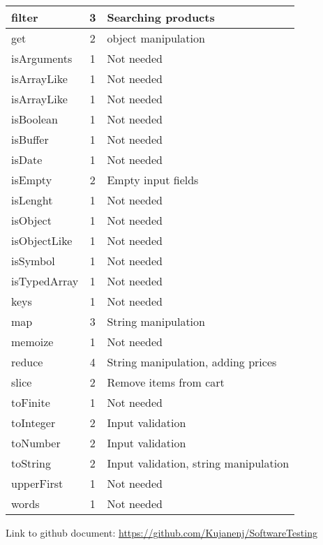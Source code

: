\documentclass[a4paper, 12pt]{article}
\begin{document}
\begin{table}[ht]
\begin{tabular}{l|c|l}
	    filter       & 3                 & Searching products                    \\ \hline
	    get          & 2                 & object manipulation                   \\ \hline
	    isArguments  & 1                 & Not needed                            \\ \hline
	    isArrayLike  & 1                 & Not needed                            \\ \hline
	    isArrayLike  & 1                 & Not needed                            \\ \hline
	    isBoolean    & 1                 & Not needed                            \\ \hline
	    isBuffer     & 1                 & Not needed                            \\ \hline
	    isDate       & 1                 & Not needed                            \\ \hline
	    isEmpty      & 2                 & Empty input fields                    \\ \hline
	    isLenght     & 1                 & Not needed                            \\ \hline
	    isObject     & 1                 & Not needed                            \\ \hline
	    isObjectLike & 1                 & Not needed                            \\ \hline
	    isSymbol     & 1                 & Not needed                            \\ \hline
	    isTypedArray & 1                 & Not needed                            \\ \hline
	    keys         & 1                 & Not needed                            \\ \hline
	    map          & 3                 & String manipulation                   \\ \hline
	    memoize      & 1                 & Not needed                            \\ \hline
	    reduce       & 4                 & String manipulation, adding prices    \\ \hline
	    slice        & 2                 & Remove items from cart                \\ \hline
	    toFinite     & 1                 & Not needed                            \\ \hline
	    toInteger    & 2                 & Input validation                      \\ \hline
	    toNumber     & 2                 & Input validation                      \\  \hline
	    toString     & 2                 & Input validation, string manipulation \\ \hline
	    upperFirst   & 1                 & Not needed                            \\ \hline
	    words        & 1                 & Not needed                           
	    \end{tabular}
    \end{table}
    
Link to github document: \href{https://github.com/Kujanenj/SoftwareTesting}{https://github.com/Kujanenj/SoftwareTesting}


    
\end{document}
